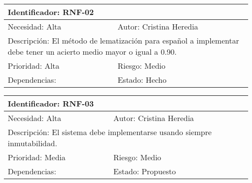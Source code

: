 \begin{table}[H]
\label{my-label}
\begin{tabular}{|l|l|l|l|l|l|l|}
\hline
\multicolumn{7}{|l|}{\textcolor{SchoolColor}{Identificador:} RNF-02}                                 \\ \hline
\multicolumn{4}{|l|}{\textcolor{SchoolColor}{Necesidad:} Alta} & \multicolumn{3}{l|}{\textcolor{SchoolColor}{Autor:} Cristina Heredia}         \\ \hline
\multicolumn{7}{|L|}{\textcolor{SchoolColor}{Descripción:} El método de lematización para español a implementar debe tener un acierto medio mayor o igual a 0.90. }                                 \\ \hline
\multicolumn{4}{|l|}{\textcolor{SchoolColor}{Prioridad: }Alta} & \multicolumn{3}{l|}{\textcolor{SchoolColor}{Riesgo:} Medio}         \\ \hline
\multicolumn{5}{|l|}{\textcolor{SchoolColor}{Dependencias: } }         & \multicolumn{2}{l|}{\textcolor{SchoolColor}{Estado:} Hecho} \\ \hline
\end{tabular}
\end{table}

\begin{table}[H]
\label{my-label}
\begin{tabular}{|l|l|l|l|l|l|l|}
\hline
\multicolumn{7}{|l|}{\textcolor{SchoolColor}{Identificador:} RNF-03}                                 \\ \hline
\multicolumn{4}{|l|}{\textcolor{SchoolColor}{Necesidad:} Alta} & \multicolumn{3}{l|}{\textcolor{SchoolColor}{Autor:} Cristina Heredia}         \\ \hline
\multicolumn{7}{|L|}{\textcolor{SchoolColor}{Descripción:} El sistema debe implementarse usando siempre
inmutabilidad. }                                 \\ \hline
\multicolumn{4}{|l|}{\textcolor{SchoolColor}{Prioridad: } Media} & \multicolumn{3}{l|}{\textcolor{SchoolColor}{Riesgo:} Medio}         \\ \hline
\multicolumn{5}{|l|}{\textcolor{SchoolColor}{Dependencias: } }         & \multicolumn{2}{l|}{\textcolor{SchoolColor}{Estado:} Propuesto} \\ \hline
\end{tabular}
\end{table}






